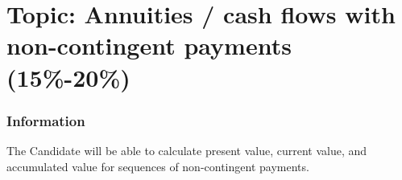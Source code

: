 \chapter[Topic: Annuities / cash flows with non-contingent payments]{Topic: Annuities / cash flows with non-contingent payments (15\%-20\%)}

\subsection{Information}

\begin{distributions}[Objective]
The Candidate will be able to calculate present value, current value, and accumulated value for sequences of non-contingent payments.
\end{distributions}

